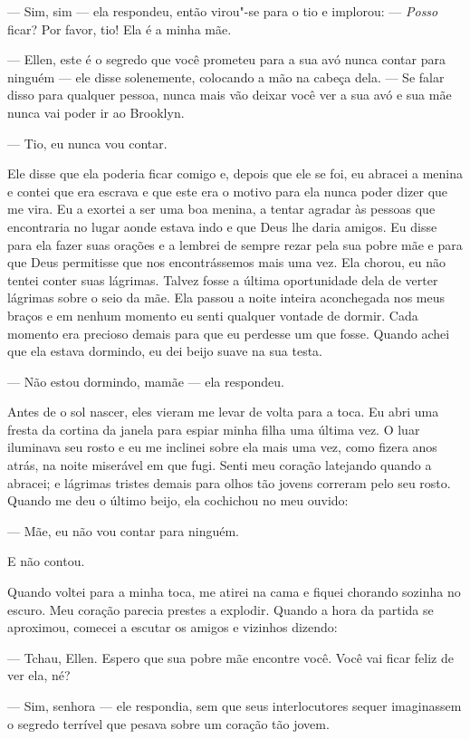--- Sim, sim --- ela respondeu, então virou"-se para o tio e implorou:
--- \emph{Posso} ficar? Por favor, tio! Ela é a minha mãe.

--- Ellen, este é o segredo que você prometeu para a sua avó nunca
contar para ninguém --- ele disse solenemente, colocando a mão na cabeça
dela. --- Se falar disso para qualquer pessoa, nunca mais vão deixar
você ver a sua avó e sua mãe nunca vai poder ir ao Brooklyn.

--- Tio, eu nunca vou contar.

Ele disse que ela poderia ficar comigo e, depois que ele se foi, eu
abracei a menina e contei que era escrava e que este era o motivo para
ela nunca poder dizer que me vira. Eu a exortei a ser uma boa menina, a
tentar agradar às pessoas que encontraria no lugar aonde estava indo e
que Deus lhe daria amigos. Eu disse para ela fazer suas orações e a
lembrei de sempre rezar pela sua pobre mãe e para que Deus permitisse
que nos encontrássemos mais uma vez. Ela chorou, eu não tentei conter
suas lágrimas. Talvez fosse a última oportunidade dela de verter
lágrimas sobre o seio da mãe. Ela passou a noite inteira aconchegada nos
meus braços e em nenhum momento eu senti qualquer vontade de dormir.
Cada momento era precioso demais para que eu perdesse um que fosse.
Quando achei que ela estava dormindo, eu dei beijo suave na sua testa.

--- Não estou dormindo, mamãe --- ela respondeu.

Antes de o sol nascer, eles vieram me
levar de volta para a toca. Eu abri uma fresta da cortina da janela para
espiar minha filha uma última vez. O luar iluminava seu rosto e eu me
inclinei sobre ela mais uma vez, como fizera anos atrás, na noite
miserável em que fugi. Senti meu coração latejando quando a abracei; e
lágrimas tristes demais para olhos tão jovens correram pelo seu rosto.
Quando me deu o último beijo, ela cochichou no meu ouvido:

--- Mãe, eu não vou contar para ninguém.

E não contou.

Quando voltei para a minha toca, me
atirei na cama e fiquei chorando sozinha no escuro. Meu coração parecia
prestes a explodir. Quando a hora da partida se aproximou, comecei a
escutar os amigos e vizinhos dizendo:

--- Tchau, Ellen. Espero que sua pobre mãe encontre você. Você vai ficar
feliz de ver ela, né?

--- Sim, senhora --- ele respondia, sem que seus interlocutores sequer
imaginassem o segredo terrível que pesava sobre um coração tão jovem.

